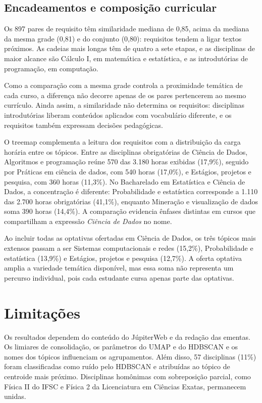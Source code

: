 \documentclass[
  12pt,
  oneside,
  a4paper,
  article,
  brazil
]{USPSC-classe/USPSC}
\begin{document}
\subsection{Encadeamentos e composição curricular}

Os 897 pares de requisito têm similaridade mediana de 0,85, acima da mediana da
mesma grade (0,81) e do conjunto (0,80): requisitos tendem a ligar textos
próximos. As cadeias mais longas têm de quatro a sete etapas, e as disciplinas
de maior alcance são Cálculo I, em matemática e estatística, e as introdutórias
de programação, em computação.

Como a comparação com a mesma grade controla a proximidade temática de cada
curso, a diferença não decorre apenas de os pares pertencerem ao mesmo
currículo. Ainda assim, a similaridade não determina os requisitos: disciplinas
introdutórias liberam conteúdos aplicados com vocabulário diferente, e os
requisitos também expressam decisões pedagógicas.

O treemap complementa a leitura dos requisitos com a distribuição da carga
horária entre os tópicos. Entre as disciplinas obrigatórias de Ciência de
Dados, Algoritmos e programação reúne 570 das 3.180 horas exibidas (17,9\%),
seguido por Práticas em ciência de dados, com 540 horas (17,0\%), e Estágios,
projetos e pesquisa, com 360 horas (11,3\%). No Bacharelado em Estatística e
Ciência de Dados, a concentração é diferente: Probabilidade e estatística
corresponde a 1.110 das 2.700 horas obrigatórias (41,1\%), enquanto Mineração
e visualização de dados soma 390 horas (14,4\%). A comparação evidencia
ênfases distintas em cursos que compartilham a expressão \emph{Ciência de Dados}
no nome.

Ao incluir todas as optativas ofertadas em Ciência de Dados, os três tópicos
mais extensos passam a ser Sistemas computacionais e redes (15,2\%),
Probabilidade e estatística (13,9\%) e Estágios, projetos e pesquisa (12,7\%).
A oferta optativa amplia a variedade temática disponível, mas essa soma não
representa um percurso individual, pois cada estudante cursa apenas parte das
optativas.

\section{Limitações}

Os resultados dependem do conteúdo do JúpiterWeb e da redação das ementas. Os
limiares de consolidação, os parâmetros do UMAP e do HDBSCAN e os nomes dos
tópicos influenciam os agrupamentos. Além disso, 57 disciplinas (11\%) foram
classificadas como ruído pelo HDBSCAN e atribuídas ao tópico de centroide mais
próximo. Disciplinas homônimas com sobreposição parcial, como Física II do IFSC e
Física 2 da Licenciatura em Ciências Exatas, permanecem unidas.
\end{document}
